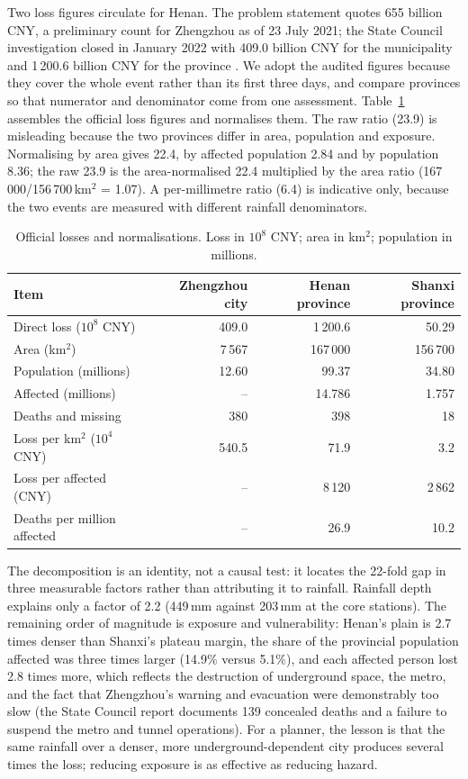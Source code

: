 Two loss figures circulate for Henan. The problem statement quotes 655 billion CNY, a preliminary count for Zhengzhou as of 23 July 2021; the State Council investigation closed in January 2022 with 409.0 billion CNY for the municipality and 1\,200.6 billion CNY for the province \cite{sc}. We adopt the audited figures because they cover the whole event rather than its first three days, and compare provinces so that numerator and denominator come from one assessment. Table~\ref{tab:q4loss} assembles the official loss figures and normalises them. The raw ratio (23.9) is misleading because the two provinces differ in area, population and exposure. Normalising by area gives 22.4, by affected population 2.84 and by population 8.36; the raw 23.9 is the area-normalised 22.4 multiplied by the area ratio (167\,000/156\,700\,km$^2$ = 1.07). A per-millimetre ratio (6.4) is indicative only, because the two events are measured with different rainfall denominators.

\begin{table}[H]
\centering
\caption{Official losses and normalisations. Loss in $10^8$ CNY; area in km$^2$; population in millions.}
\label{tab:q4loss}
\small
\begin{tabular}{lrrr}
\toprule
 \textbf{Item} & Zhengzhou city & Henan province & Shanxi province\\
\midrule
Direct loss ($10^8$ CNY) & 409.0 & 1\,200.6 & 50.29\\
Area (km$^2$) & 7\,567 & 167\,000 & 156\,700\\
Population (millions) & 12.60 & 99.37 & 34.80\\
Affected (millions) & -- & 14.786 & 1.757\\
Deaths and missing & 380 & 398 & 18\\
\midrule
Loss per km$^2$ ($10^4$ CNY) & 540.5 & 71.9 & 3.2\\
Loss per affected (CNY) & -- & 8\,120 & 2\,862\\
Deaths per million affected & -- & 26.9 & 10.2\\
\bottomrule
\end{tabular}
\end{table}

The decomposition is an identity, not a causal test: it locates the 22-fold gap in three measurable factors rather than attributing it to rainfall. Rainfall depth explains only a factor of 2.2 (449\,mm against 203\,mm at the core stations). The remaining order of magnitude is exposure and vulnerability: Henan's plain is 2.7 times denser than Shanxi's plateau margin, the share of the provincial population affected was three times larger (14.9\% versus 5.1\%), and each affected person lost 2.8 times more, which reflects the destruction of underground space, the metro, and the fact that Zhengzhou's warning and evacuation were demonstrably too slow (the State Council report \cite{sc} documents 139 concealed deaths and a failure to suspend the metro and tunnel operations). For a planner, the lesson is that the same rainfall over a denser, more underground-dependent city produces several times the loss; reducing exposure is as effective as reducing hazard.


